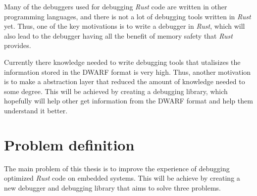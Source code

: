 Many of the debuggers used for debugging \emph{Rust} code are written in other programming languages, and there is not a lot of debugging tools written in \emph{Rust} yet.
Thus, one of the key motivations is to write a debugger in \emph{Rust}, which will also lead to the debugger having all the benefit of memory safety that \emph{Rust} provides.


Currently there knowledge needed to write debugging tools that utalisizes the information stored in the \gls{DWARF} format is very high.
Thus, another motivation is to make a abstraction layer that reduced the amount of knowledge needed to some degree.
This will be achieved by creating a debugging library, which hopefully will help other get information from the \gls{DWARF} format and help them understand it better.


\section{Problem definition} \label{sec:problemDef}
 

The main problem of this thesis is to improve the experience of debugging optimized \emph{Rust} code on embedded systems.
This will be achieve by creating a new debugger and debugging library that aims to solve three problems.


